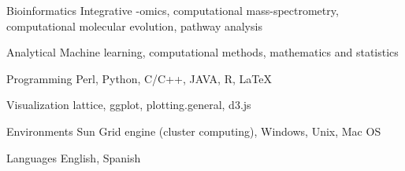 


\begin{cvskills}

\cvskill
{Bioinformatics}
{Integrative -omics, computational mass-spectrometry, computational molecular evolution, pathway analysis}

\cvskill
{Analytical}
{Machine learning, computational methods, mathematics and statistics}

\cvskill
{Programming} %
{Perl, Python, C/C++, JAVA, R, LaTeX} %

\cvskill
{Visualization}
{lattice, ggplot, plotting.general, d3.js}


\cvskill
{Environments} %
	{Sun Grid engine (cluster computing), Windows, Unix, Mac OS} %

\cvskill
{Languages} %
{English, Spanish} %


\end{cvskills}
